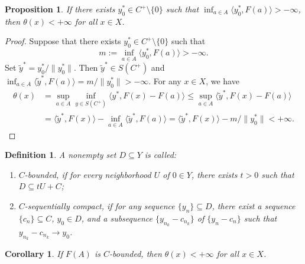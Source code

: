 \documentclass[11pt]{article}
\newtheorem{definition}{Definition}[section]
\newtheorem{corollary}{Corollary}[section]
\newtheorem{proposition}{Proposition}[section]
\begin{document}
\begin{proposition}\label{AQWE}
	If there exists    $y_0^*\in C^+\setminus\{0\}$ such that $\inf_{a\in A}\langle y_0^*,F(a)\rangle > -\infty$, then $\theta(x)<+\infty$ for all $x\in X$.
\end{proposition}
\begin{proof}
	Suppose  that  there exists $y_0^*\in C^+\setminus\{0\}$ such that
	\[
	m:=\inf_{a\in A}\langle y_0^*,F(a)\rangle > -\infty.
	\]
	Set $\tilde y^*=y_0^*/\|y_0^*\|$.  Then $\tilde y^*\in S(C^+)$ and $\inf_{a\in A}\langle\tilde y^*,F(a)\rangle = m/\|y_0^*\| > -\infty$.   For any $x\in X$, we have
	\[
	\begin{aligned}
		\theta(x) &= \sup_{a \in A} \inf_{y \in S(C^+)} \langle y^*, F(x) - F(a) \rangle  
		\leq \sup_{a \in A} \langle \tilde y^*, F(x) - F(a) \rangle \\
		&= \langle \tilde y^*, F(x) \rangle - \inf_{a \in A} \langle \tilde y^*, F(a) \rangle  
		= \langle \tilde y^*, F(x) \rangle - m/\|y_0^*\| < + \infty.
	\end{aligned}
	\]
\end{proof}

\begin{definition}  	\cite{Luc, DF2024} 
	A nonempty set $D \subseteq Y$ is called:
	\begin{enumerate}
		\item[(i)] $C$-bounded, if for every neighborhood $U$ of $0 \in Y$, there exists $t > 0$ such that $D \subseteq tU + C$;
		\item[(ii)] $C$-sequentially compact, if for any sequence $\{y_n\}  \subseteq D$, there exist a sequence $\{c_n\}  \subseteq C$, $y_0 \in D$, and a subsequence $\{y_{n_k} - c_{n_k}\} $ of $\{y_n - c_n\} $ such that $y_{n_k} - c_{n_k} \to y_0$.
	\end{enumerate}
\end{definition}

\begin{corollary} \label{ZRUQ}
	If $F(A)$ is $C$-bounded, then $\theta(x)<+\infty$ for all $x\in X$.
\end{corollary}
\end{document}
